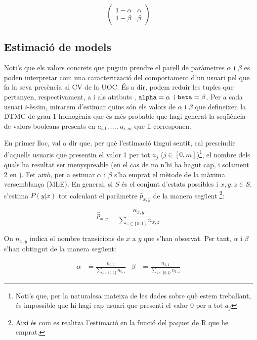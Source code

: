 \documentclass[
	a4paper,
	twoside,
	justified
]{tufte-book}
\begin{document}
$$
\begin{pmatrix}
1 - \alpha & \alpha \\
1 - \beta & \beta
\end{pmatrix}
$$

\subsection{Estimació de models}

Noti's que els valors concrets que puguin prendre el parell de paràmetres $\alpha$ i $\beta$ es poden interpretar com una caracterització del comportament d'un usuari pel que fa la seva presència al CV de la UOC. És a dir, podem reduir les tuples que pertanyen, respectivament, a  i  als atributs , $\texttt{alpha} = \alpha$ i $\texttt{beta} = \beta$. Per a cada usuari $i$-èssim, mirarem d'estimar quins són els valors de $\alpha$ i $\beta$ que defineixen la DTMC de grau 1 homogènia que és més probable que hagi generat la seqüència de valors booleans presents en $a_{i,0},\ldots,a_{i,m}$ que li corresponen. 

En primer lloc, val a dir que, per què l'estimació tingui sentit, cal prescindir d'aquells usuaris que presentin el valor 1 per tot $a_j$ ($j \in [0,m]$)\footnote{Noti's que, per la naturalesa mateixa de les dades sobre què estem treballant, és impossible que hi hagi cap usuari que presenti el valor 0 per a tot $a_j$}, el nombre dels quals ha resultat ser menyspreable (en el cas de  no n'hi ha hagut cap, i solament 2 en ). Fet això, per a estimar $\alpha$ i $\beta$ s'ha emprat el mètode de la màxima versemblança (MLE). En general, si $S$ és el conjunt d'estats possibles i  $x,y,z \in S$, s'estima $P(y|x)$ tot calculant el paràmetre $\widehat{p}_{x,y}$ de la manera següent \citep{spedicato14}\footnote{Així és com es realitza l'estimació en la funció  del paquet  de R que he emprat.}:

$$
	\widehat{p}_{x,y} = \frac{n_{x,y}}{ \displaystyle \sum_{z \in \{0,1\}} n_{x,z}} 
$$   

On $n_{x,y}$ indica el nombre transicions de $x$ a $y$ que s'han observat. Per tant, $\alpha$ i $\beta$ s'han obtingut de la manera següent:

\begin{align*}
\alpha & = \frac{n_{0,1}}{ \displaystyle \sum_{z \in \{0,1\}} n_{0,z}} &
\beta & = \frac{n_{1,1}}{ \displaystyle \sum_{z \in \{0,1\}} n_{1,z}}
\end{align*}
\end{document}
